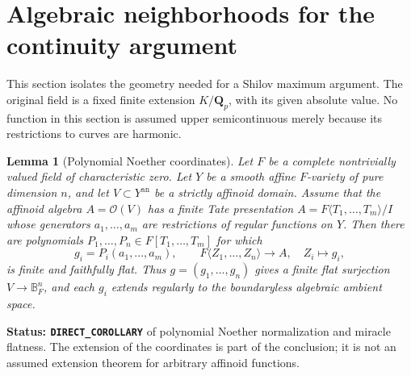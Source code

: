 \documentclass[11pt,a4paper]{article}
\numberwithin{equation}{section}
\newtheorem{lemma}[theorem]{Lemma}
\theoremstyle{definition}
\theoremstyle{remark}
\begin{document}
\section{Algebraic neighborhoods for the continuity argument}
\label{sec:r5-algebraic-continuity-geometry}

This section isolates the geometry needed for a Shilov maximum
argument. The original field is a fixed finite extension
$K/\mathbf Q_p$, with its given absolute value. No function in this
section is assumed upper semicontinuous merely because its
restrictions to curves are harmonic.

\begin{lemma}[Polynomial Noether coordinates]
\label{lem:r5-polynomial-noether-coordinates}
Let $F$ be a complete nontrivially valued field of characteristic
zero. Let $Y$ be a smooth affine $F$-variety of pure dimension $n$,
and let $V\subset Y^{\mathrm{an}}$ be a strictly affinoid domain.
Assume that the affinoid algebra $A=\mathscr O(V)$ has a finite
Tate presentation $A=F\langle T_1,\ldots,T_m\rangle/I$ whose
generators $a_1,\ldots,a_m$ are restrictions of regular
functions on $Y$. Then there are
polynomials $P_1,\ldots,P_n\in F[T_1,\ldots,T_m]$ for which
\[
 g_i=P_i(a_1,\ldots,a_m),\qquad
 F\langle Z_1,\ldots,Z_n\rangle\longrightarrow A,\quad Z_i\mapsto g_i,
\]
is finite and faithfully flat. Thus $g=(g_1,\ldots,g_n)$ gives a
finite flat surjection $V\to\mathbb B_F^n$, and each $g_i$
extends regularly to the boundaryless algebraic ambient space.
\end{lemma}

\noindent\textbf{Status: \texttt{DIRECT\_COROLLARY}} of polynomial
Noether normalization and miracle flatness. The extension of the
coordinates is part of the conclusion; it is not an assumed
extension theorem for arbitrary affinoid functions.
\end{document}
